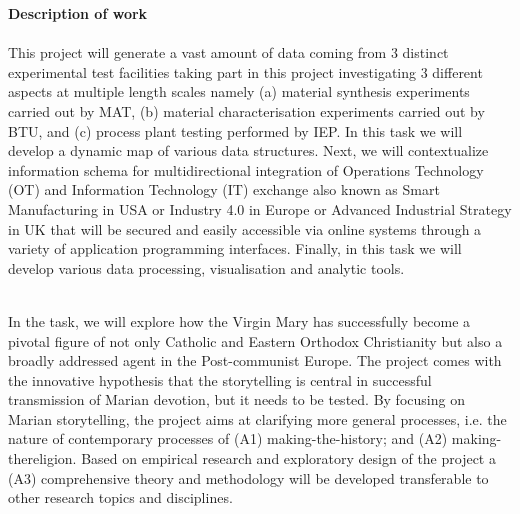 \textbf{Description of work}\\
\\
This project will generate a vast amount of data coming from 3 distinct experimental test facilities taking part in this project investigating 3 different aspects at multiple length scales namely (a) material synthesis experiments carried out by MAT, (b) material characterisation experiments carried out by BTU, and (c) process plant testing performed by IEP. In this task we will develop a dynamic map of various data structures. Next, we will contextualize information schema for multidirectional integration of Operations Technology (OT) and Information Technology (IT) exchange also known as Smart Manufacturing in USA or Industry 4.0 in Europe or Advanced Industrial Strategy in UK that will be secured and easily accessible via online systems through a variety of application programming interfaces. Finally, in this task we will develop various data processing, visualisation and analytic tools.

\\
In the task, we will explore how the Virgin Mary has successfully become a pivotal figure of not only Catholic and Eastern Orthodox Christianity but also a broadly addressed agent in the Post-communist Europe. The project comes with the innovative hypothesis that the storytelling is central in successful transmission of Marian devotion, but it needs to be tested. By focusing on Marian storytelling, the project aims at clarifying more general processes, i.e. the nature of contemporary processes of (A1) making-the-history; and (A2) making-thereligion. Based on empirical research and exploratory design of the project a (A3) comprehensive theory and methodology will be developed transferable to other research topics and disciplines.

